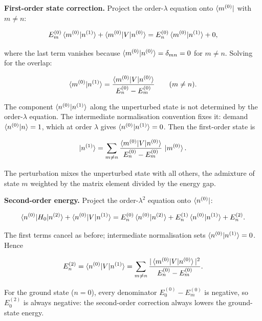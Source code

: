 \medskip\noindent\textbf{First-order state correction.}
Project the order-$\lambda$ equation onto $\bra{m^{(0)}}$ with $m \neq n$:
\begin{linenomath}
\begin{equation*}
E_{m}^{(0)}\braket{m^{(0)}|n^{(1)}} + \braket{m^{(0)}|V|n^{(0)}} = E_{n}^{(0)}\braket{m^{(0)}|n^{(1)}} + 0,
\end{equation*}
\end{linenomath}
where the last term vanishes because $\braket{m^{(0)}|n^{(0)}}=\delta_{mn}=0$ for $m\neq n$. Solving for the overlap:
\begin{linenomath}
\begin{equation*}
\braket{m^{(0)}|n^{(1)}} = \frac{\braket{m^{(0)}|V|n^{(0)}}}{E_{n}^{(0)}-E_{m}^{(0)}} \qquad (m \neq n).
\end{equation*}
\end{linenomath}
The component $\braket{n^{(0)}|n^{(1)}}$ along the unperturbed state is not determined by the order-$\lambda$ equation. The intermediate normalisation convention fixes it: demand $\braket{n^{(0)}|n}=1$, which at order $\lambda$ gives $\braket{n^{(0)}|n^{(1)}}=0$. Then the first-order state is
\begin{linenomath}
\begin{equation}
\ket{n^{(1)}} = \sum_{m \neq n} \frac{\braket{m^{(0)}|V|n^{(0)}}}{E_{n}^{(0)}-E_{m}^{(0)}}\,\ket{m^{(0)}}.
\label{eq:rs-first-order-state}
\end{equation}
\end{linenomath}
The perturbation mixes the unperturbed state with all others, the admixture of state $m$ weighted by the matrix element divided by the energy gap.

\medskip\noindent\textbf{Second-order energy.}
Project the order-$\lambda^{2}$ equation onto $\bra{n^{(0)}}$:
\begin{linenomath}
\begin{equation*}
\braket{n^{(0)}|H_{0}|n^{(2)}} + \braket{n^{(0)}|V|n^{(1)}} = E_{n}^{(0)}\braket{n^{(0)}|n^{(2)}} + E_{n}^{(1)}\braket{n^{(0)}|n^{(1)}} + E_{n}^{(2)}.
\end{equation*}
\end{linenomath}
The first terms cancel as before; intermediate normalisation sets $\braket{n^{(0)}|n^{(1)}}=0$. Hence
\begin{linenomath}
\begin{equation}
E_{n}^{(2)} = \braket{n^{(0)}|V|n^{(1)}} = \sum_{m \neq n}\frac{|\braket{m^{(0)}|V|n^{(0)}}|^{2}}{E_{n}^{(0)}-E_{m}^{(0)}}.
\label{eq:rs-second-order-energy}
\end{equation}
\end{linenomath}
For the ground state ($n=0$), every denominator $E_{0}^{(0)}-E_{m}^{(0)}$ is negative, so $E_{0}^{(2)}$ is always negative: the second-order correction always lowers the ground-state energy.

